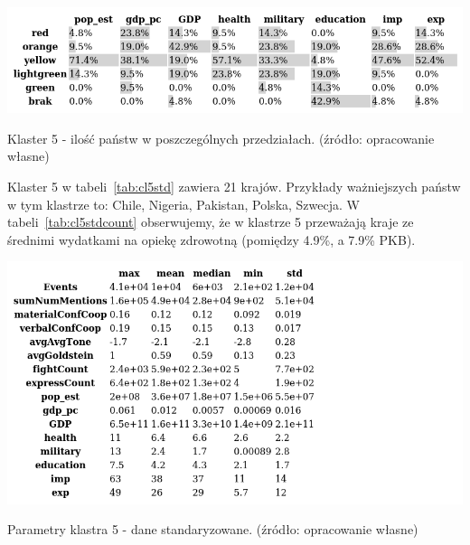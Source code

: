 \documentclass[11pt]{report}
\begin{document}
    \begin{table}[!htp]
        \centering
        \includegraphics[width=\linewidth]{tables/CLUST/cluster5stdkmeanscount.png}
        \caption{Klaster 5 - ilość państw w poszczególnych przedziałach. (źródło: opracowanie własne)}
        \label{tab:cl5stdcount}
    \end{table}

    Klaster 5 w tabeli~\ref{tab:cl5std} zawiera 21 krajów.
    Przykłady ważniejszych państw w tym klastrze to: Chile, Nigeria, Pakistan, Polska, Szwecja.
    W tabeli~\ref{tab:cl5stdcount} obserwujemy, że w klastrze 5 przeważają kraje ze średnimi wydatkami na opiekę zdrowotną (pomiędzy 4.9\%, a 7.9\% PKB).

    \begin{table}[!htp]
        \centering
        \includegraphics[width=\linewidth]{tables/CLUST/desc/clust5std_desc.png}
        \caption{Parametry klastra 5 - dane standaryzowane. (źródło: opracowanie własne)}
        \label{tab:cl5std_desc}
    \end{table}
\end{document}

